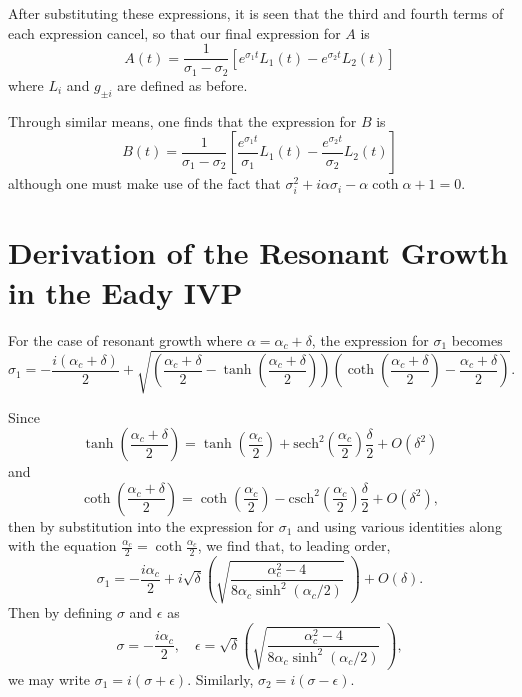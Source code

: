 \documentclass[letterpaper,11pt,onecolumn,twoside,titlepage]{article}
\begin{document}
\begin{appendix}
After substituting these expressions, it is seen that the third and fourth terms of each expression cancel, so that our final expression for $A$ is
\[
A(t) = \frac{1}{\sigma_1 - \sigma_2}\left[e^{\sigma_1 t} L_1(t) - e^{\sigma_2 t} L_2(t)\right]
\] 
where $L_i$ and $g_{\pm i}$ are defined as before.

Through similar means, one finds that the expression for $B$ is
\[
B(t) = \frac{1}{\sigma_1 - \sigma_2}\left[\frac{e^{\sigma_1 t}}{\sigma_1} L_1(t) - \frac{e^{\sigma_2 t}}{\sigma_2} L_2(t)\right]
\]
although one must make use of the fact that $\sigma_i^2 + i \alpha \sigma_i - \alpha \coth \alpha + 1 = 0$.


\section{Derivation of the Resonant Growth in the Eady IVP}\label{EadyIVP:Resonance}

For the case of resonant growth where $\alpha = \alpha_c + \delta$, the expression for $\sigma_1$ becomes
\[
\sigma_1 = -\frac{i(\alpha_c + \delta)}{2} + \sqrt{\left(\frac{\alpha_c + \delta}{2} - \tanh \left(\frac{\alpha_c + \delta}{2}\right)\right) \left(\coth\left(\frac{\alpha_c + \delta}{2}\right) - \frac{\alpha_c + \delta}{2}\right)}.
\]

Since
\[
\tanh\left(\frac{\alpha_c + \delta}{2}\right) = \tanh\left(\frac{\alpha_c}{2}\right) + \text{sech}^2\left(\frac{\alpha_c}{2}\right) \frac{\delta}{2} + O\left(\delta^2\right)
\] and \[
\coth\left(\frac{\alpha_c + \delta}{2}\right) = \coth\left(\frac{\alpha_c}{2}\right) - \text{csch}^2\left(\frac{\alpha_c}{2}\right) \frac{\delta}{2} + O\left(\delta^2\right),
\]
then by substitution into the expression for $\sigma_1$ and using various identities along with the equation $\frac{\alpha_c}{2} = \coth \frac{\alpha_c}{2}$, we find that, to leading order,
\[
\sigma_1 = -\frac{i \alpha_c}{2} + i \sqrt{\delta} \left(\sqrt{\frac{\alpha_c^2 - 4}{8\alpha_c \sinh^2 (\alpha_c / 2)}} \; \right) + O(\delta).
\]
Then by defining $\sigma$ and $\epsilon$ as
\[
\sigma = -\frac{i \alpha_c}{2}, \quad
\epsilon = \sqrt{\delta} \left(\sqrt{\frac{\alpha_c^2 - 4}{8\alpha_c \sinh^2 (\alpha_c / 2)}} \; \right),
\]
we may write $\sigma_1 = i(\sigma + \epsilon)$. Similarly, $\sigma_2 = i(\sigma - \epsilon)$.


\end{appendix}
\end{document}
